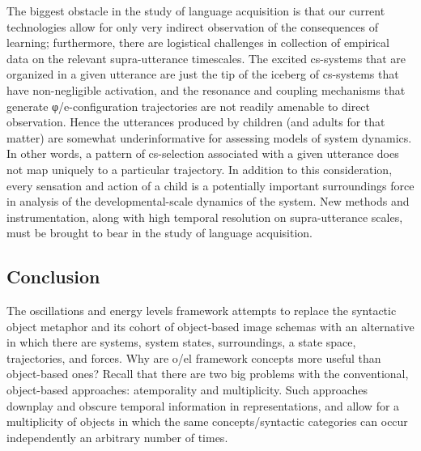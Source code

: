 The biggest obstacle in the study of language acquisition is that our current technologies allow for only very indirect observation of the consequences of learning; furthermore, there are logistical challenges in collection of empirical data on the relevant supra-utterance timescales. The excited cs-systems that are organized in a given utterance are just the tip of the iceberg of cs-systems that have non-negligible activation, and the resonance and coupling mechanisms that generate φ/e-configuration trajectories are not readily amenable to direct observation. Hence the utterances produced by children (and adults for that matter) are somewhat underinformative for assessing models of system dynamics. In other words, a pattern of cs-selection associated with a given utterance does not map uniquely to a particular trajectory. In addition to this consideration, every sensation and action of a child is a potentially important surroundings force in analysis of the developmental-scale dynamics of the system. New methods and instrumentation, along with high temporal resolution on supra-utterance scales, must be brought to bear in the study of language acquisition.

\subsection{Conclusion}

The oscillations and energy levels framework attempts to replace the syntactic object metaphor and its cohort of object-based image schemas with an alternative in which there are systems, system states, surroundings, a state space, trajectories, and forces. Why are o/el framework concepts more useful than object-based ones? Recall that there are two big problems with the conventional, object-based approaches: atemporality and multiplicity. Such approaches downplay and obscure temporal information in representations, and allow for a multiplicity of objects in which the same concepts/syntactic categories can occur independently an arbitrary number of times. 

